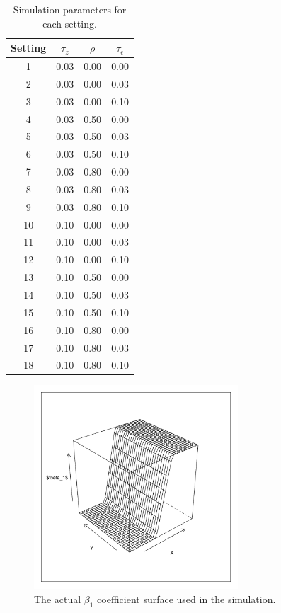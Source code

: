 \documentclass[authoryear, review, 11pt]{elsarticle}
\begin{document}
\begin{table}[h!]
	\begin{center}
	\begin{tabular}{cccc}
		\hline
		Setting & $\tau_z$ & $\rho$ & $\tau_{\epsilon}$ \\ 
		\hline
		1 & 0.03 & 0.00 & 0.00 \\ 
		2 & 0.03 & 0.00 & 0.03 \\ 
		3 & 0.03 & 0.00 & 0.10 \\ 
		4 & 0.03 & 0.50 & 0.00 \\ 
		5 & 0.03 & 0.50 & 0.03 \\ 
		6 & 0.03 & 0.50 & 0.10 \\ 
		7 & 0.03 & 0.80 & 0.00 \\ 
		8 & 0.03 & 0.80 & 0.03 \\ 
		9 & 0.03 & 0.80 & 0.10 \\ 
		10 & 0.10 & 0.00 & 0.00 \\ 
		11 & 0.10 & 0.00 & 0.03 \\ 
		12 & 0.10 & 0.00 & 0.10 \\ 
		13 & 0.10 & 0.50 & 0.00 \\ 
		14 & 0.10 & 0.50 & 0.03 \\ 
		15 & 0.10 & 0.50 & 0.10 \\ 
		16 & 0.10 & 0.80 & 0.00 \\ 
		17 & 0.10 & 0.80 & 0.03 \\ 
		18 & 0.10 & 0.80 & 0.10
	\end{tabular}
	\end{center}
	\caption{Simulation parameters for each setting.\label{table:simulation_settings}}
\end{table}

	\begin{figure}
		\begin{center}
			\includegraphics[height=3in]{../../figures/scratch/beta1-actual.pdf}
			\caption{The actual $\beta_1$ coefficient surface used in the simulation.\label{fig:beta1-actual}}
		\end{center}
	\end{figure}
	
\end{document}

